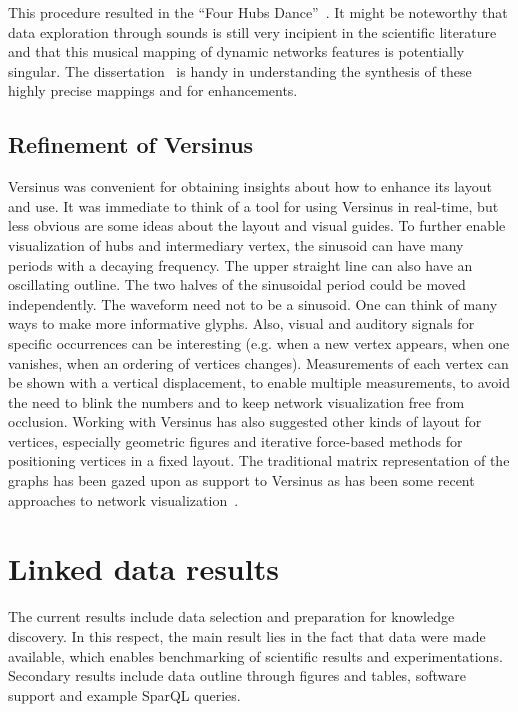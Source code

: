 This procedure resulted in the ``Four Hubs Dance''~\cite{animacoes}.
It might be noteworthy that data exploration through sounds is still very incipient
in the scientific literature and that this musical mapping of dynamic networks features
is potentially singular.
The dissertation~\cite{mad} is handy in understanding the synthesis of these highly precise mappings
and for enhancements.


\subsection{Refinement of Versinus}\label{sec:verref}
Versinus was convenient for obtaining insights about how to enhance its layout and use.
It was immediate to think of a tool for using Versinus
in real-time, but less obvious are some ideas about the layout and visual guides. 
To further enable visualization of hubs and intermediary vertex,
the sinusoid can have many periods 
with a decaying frequency.
The upper straight line can also have an oscillating outline.
The two halves of the sinusoidal period could be moved independently.
The waveform need not to be a sinusoid.
One can think of many ways to make more informative glyphs.
Also, visual and auditory signals for specific occurrences can be interesting
(e.g. when a new vertex appears, when one vanishes, when an ordering of vertices changes).
Measurements of each vertex can be shown with a vertical displacement,
to enable multiple measurements, to avoid the need to blink the numbers and to keep network visualization free from occlusion.
Working with Versinus has also suggested other kinds of layout for vertices, 
especially geometric figures and iterative force-based methods for positioning vertices in a fixed layout.
The traditional matrix representation of the graphs has been gazed upon as support to Versinus 
as has been some recent approaches to network visualization~\cite{Viz1}.


\section{Linked data results}
\label{outline}
The current results include data selection and preparation for knowledge discovery.
In this respect, the main result lies in the fact that data were made available, which enables benchmarking of scientific results
and experimentations.
Secondary results include data outline through figures and tables,
software support and example SparQL queries.

